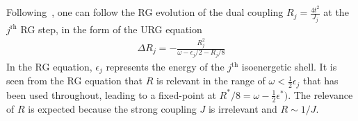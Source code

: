 \documentclass[12pt]{revtex4-2}
\begin{document}
Following~\cite{anirbanmott1}, one can follow the RG evolution of the dual coupling \(R_j = \frac{4t^2}{J_j}\) at the \(j^\text{rh}\) RG step, in the form of the URG equation
\begin{equation}\begin{aligned}
	\Delta R_j =- \frac{R_j^2}{\omega - \epsilon_{j}/2 - R_j/8}
\end{aligned}\end{equation}
In the RG equation, \(\epsilon_{j}\) represents the energy of the \(j^\text{th}\) isoenergetic shell. It is seen from the RG equation that \(R\) is relevant in the range of \(\omega < \frac{1}{2}\epsilon_j\) that has been used throughout, leading to a fixed-point at \(R^*/8 = \omega - \frac{1}{2}\epsilon^*)\). The relevance of \(R\) is expected because the strong coupling \(J\) is irrelevant and \(R \sim 1/J\).
\end{document}
